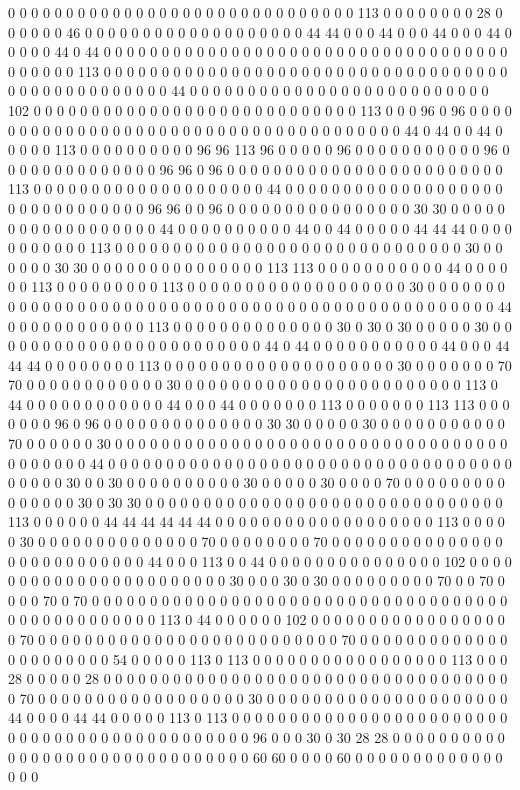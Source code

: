 0 0 0 0 0 0 0 0 0 0 0 0 0 0 0 0 0 0 0 0 0 0 0 0 0 0 0 0 0 0 113 0 0 0 0 0 0 0 0 28 0 0 0 0 0 0 46 0 0 0 0 0 0 0 0 0 0 0 0 0 0 0 0 0 0 0 44 44 0 0 0 44 0 0 0 44 0 0 0 44 0 0 0 0 0 44 0 44 0 0 0 0 0 0 0 0 0 0 0 0 0 0 0 0 0 0 0 0 0 0 0 0 0 0 0 0 0 0 0 0 0 0 0 0 0 0 0 0 0 113 0 0 0 0 0 0 0 0 0 0 0 0 0 0 0 0 0 0 0 0 0 0 0 0 0 0 0 0 0 0 0 0 0 0 0 0 0 0 0 0 0 0 0 0 0 0 0 0 0 44 0 0 0 0 0 0 0 0 0 0 0 0 0 0 0 0 0 0 0 0 0 0 0 0 0 0 102 0 0 0 0 0 0 0 0 0 0 0 0 0 0 0 0 0 0 0 0 0 0 0 0 0 0 0 0 113 0 0 0 96 0 96 0 0 0 0 0 0 0 0 0 0 0 0 0 0 0 0 0 0 0 0 0 0 0 0 0 0 0 0 0 0 0 0 0 0 0 0 0 0 44 0 44 0 0 44 0 0 0 0 0 113 0 0 0 0 0 0 0 0 0 0 96 96 113 96 0 0 0 0 0 96 0 0 0 0 0 0 0 0 0 0 0 96 0 0 0 0 0 0 0 0 0 0 0 0 0 0 96 96 0 96 0 0 0 0 0 0 0 0 0 0 0 0 0 0 0 0 0 0 0 0 0 0 0 0 113 0 0 0 0 0 0 0 0 0 0 0 0 0 0 0 0 0 0 0 0 44 0 0 0 0 0 0 0 0 0 0 0 0 0 0 0 0 0 0 0 0 0 0 0 0 0 0 0 0 0 0 0 96 96 0 0 96 0 0 0 0 0 0 0 0 0 0 0 0 0 0 0 0 30 30 0 0 0 0 0 0 0 0 0 0 0 0 0 0 0 0 0 0 44 0 0 0 0 0 0 0 0 0 0 44 0 0 44 0 0 0 0 0 44 44 44 0 0 0 0 0 0 0 0 0 0 0 113 0 0 0 0 0 0 0 0 0 0 0 0 0 0 0 0 0 0 0 0 0 0 0 0 0 0 0 0 0 0 30 0 0 0 0 0 0 30 30 0 0 0 0 0 0 0 0 0 0 0 0 0 0 0 113 113 0 0 0 0 0 0 0 0 0 0 0 44 0 0 0 0 0 0 113 0 0 0 0 0 0 0 0 0 113 0 0 0 0 0 0 0 0 0 0 0 0 0 0 0 0 0 0 0 30 0 0 0 0 0 0 0 0 0 0 0 0 0 0 0 0 0 0 0 0 0 0 0 0 0 0 0 0 0 0 0 0 0 0 0 0 0 0 0 0 0 0 0 0 0 0 0 0 0 44 0 0 0 0 0 0 0 0 0 0 0 0 113 0 0 0 0 0 0 0 0 0 0 0 0 0 0 30 0 30 0 30 0 0 0 0 0 30 0 0 0 0 0 0 0 0 0 0 0 0 0 0 0 0 0 0 0 0 0 0 0 0 44 0 44 0 0 0 0 0 0 0 0 0 0 0 44 0 0 0 44 44 44 0 0 0 0 0 0 0 0 113 0 0 0 0 0 0 0 0 0 0 0 0 0 0 0 0 0 0 0 0 30 0 0 0 0 0 0 0 70 70 0 0 0 0 0 0 0 0 0 0 0 0 30 0 0 0 0 0 0 0 0 0 0 0 0 0 0 0 0 0 0 0 0 0 0 0 0 113 0 44 0 0 0 0 0 0 0 0 0 0 0 0 44 0 0 0 44 0 0 0 0 0 0 0 113 0 0 0 0 0 0 0 113 113 0 0 0 0 0 0 0 96 0 96 0 0 0 0 0 0 0 0 0 0 0 0 0 0 30 30 0 0 0 0 0 30 0 0 0 0 0 0 0 0 0 0 0 70 0 0 0 0 0 0 30 0 0 0 0 0 0 0 0 0 0 0 0 0 0 0 0 0 0 0 0 0 0 0 0 0 0 0 0 0 0 0 0 0 0 0 0 0 0 0 0 0 44 0 0 0 0 0 0 0 0 0 0 0 0 0 0 0 0 0 0 0 0 0 0 0 0 0 0 0 0 0 0 0 0 0 0 0 0 0 0 0 0 30 0 0 30 0 0 0 0 0 0 0 0 0 0 30 0 0 0 0 0 30 0 0 0 0 70 0 0 0 0 0 0 0 0 0 0 0 0 0 0 0 30 0 30 30 0 0 0 0 0 0 0 0 0 0 0 0 0 0 0 0 0 0 0 0 0 0 0 0 0 0 0 0 0 0 0 113 0 0 0 0 0 0 44 44 44 44 44 44 0 0 0 0 0 0 0 0 0 0 0 0 0 0 0 0 0 0 0 113 0 0 0 0 0 30 0 0 0 0 0 0 0 0 0 0 0 0 0 0 70 0 0 0 0 0 0 0 0 70 0 0 0 0 0 0 0 0 0 0 0 0 0 0 0 0 0 0 0 0 0 0 0 0 0 0 0 44 0 0 0 113 0 0 44 0 0 0 0 0 0 0 0 0 0 0 0 0 0 0 102 0 0 0 0 0 0 0 0 0 0 0 0 0 0 0 0 0 0 0 0 0 0 0 30 0 0 0 30 0 30 0 0 0 0 0 0 0 0 0 70 0 0 70 0 0 0 0 70 0 70 0 0 0 0 0 0 0 0 0 0 0 0 0 0 0 0 0 0 0 0 0 0 0 0 0 0 0 0 0 0 0 0 0 0 0 0 0 0 0 0 0 0 0 0 0 0 0 0 0 113 0 44 0 0 0 0 0 0 102 0 0 0 0 0 0 0 0 0 0 0 0 0 0 0 0 0 0 70 0 0 0 0 0 0 0 0 0 0 0 0 0 0 0 0 0 0 0 0 0 0 0 0 0 0 70 0 0 0 0 0 0 0 0 0 0 0 0 0 0 0 0 0 0 0 0 0 0 54 0 0 0 0 0 113 0 113 0 0 0 0 0 0 0 0 0 0 0 0 0 0 0 0 0 113 0 0 0 28 0 0 0 0 0 28 0 0 0 0 0 0 0 0 0 0 0 0 0 0 0 0 0 0 0 0 0 0 0 0 0 0 0 0 0 0 0 0 0 0 0 0 70 0 0 0 0 0 0 0 0 0 0 0 0 0 0 0 0 0 0 30 0 0 0 0 0 0 0 0 0 0 0 0 0 0 0 0 0 0 0 0 0 44 0 0 0 0 44 44 0 0 0 0 0 113 0 113 0 0 0 0 0 0 0 0 0 0 0 0 0 0 0 0 0 0 0 0 0 0 0 0 0 0 0 0 0 0 0 0 0 0 0 0 0 0 0 0 0 0 0 0 0 96 0 0 0 30 0 30 28 28 0 0 0 0 0 0 0 0 0 0 0 0 0 0 0 0 0 0 0 0 0 0 0 0 0 0 0 0 0 0 0 60 60 0 0 0 0 60 0 0 0 0 0 0 0 0 0 0 0 0 0 0 0 0 